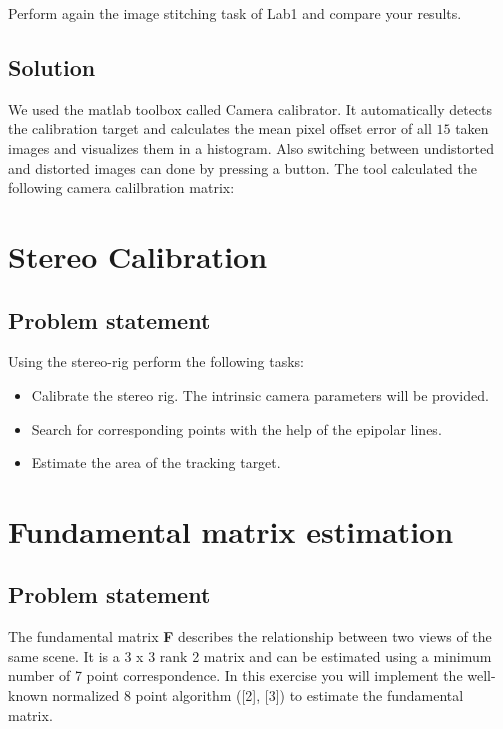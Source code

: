 \documentclass[
a4paper,     %
11pt         %
]{scrartcl}  %
\begin{document}
Perform again the image stitching task of Lab1 and compare your results.

\subsection{Solution}

We used the matlab toolbox called Camera calibrator.
It automatically detects the calibration target and calculates the mean pixel offset error of all $15$ taken images and visualizes them in a histogram.
Also switching between undistorted and distorted images can done by pressing a button.
The tool calculated the following camera calilbration matrix:


\section{Stereo Calibration}

\subsection{Problem statement}

Using the stereo-rig perform the following tasks:

\begin{itemize}
 \item Calibrate the stereo rig. The intrinsic camera parameters will be provided.
 \item Search for corresponding points with the help of the epipolar lines.
 \item Estimate the area of the tracking target.
\end{itemize}






\section{Fundamental matrix estimation}

\subsection{Problem statement}

The fundamental matrix \textbf{F} describes the relationship between two views of the same scene. It is a 3 x 3 rank
2 matrix and can be estimated using a minimum number of 7 point correspondence. In this exercise you will
implement the well-known normalized 8 point algorithm ([2], [3]) to estimate the fundamental matrix.
\end{document}
